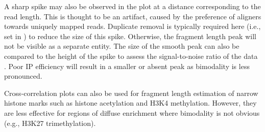 \documentclass{report}\usepackage[]{graphicx}\usepackage[usenames,dvipsnames]{color}
\begin{document}
A sharp spike may also be observed in the plot at a distance corresponding to the read length. 
This is thought to be an artifact, caused by the preference of aligners towards uniquely mapped reads. 
Duplicate removal is typically required here (i.e., set  in ) to reduce the size of this spike. 
Otherwise, the fragment length peak will not be visible as a separate entity.
The size of the smooth peak can also be compared to the height of the spike to assess the signal-to-noise ratio of the data \cite{landt2012}. 
Poor IP efficiency will result in a smaller or absent peak as bimodality is less pronounced. 

Cross-correlation plots can also be used for fragment length estimation of narrow histone marks such as histone acetylation and H3K4 methylation.
However, they are less effective for regions of diffuse enrichment where bimodality is not obvious (e.g., H3K27 trimethylation).
\end{document}
